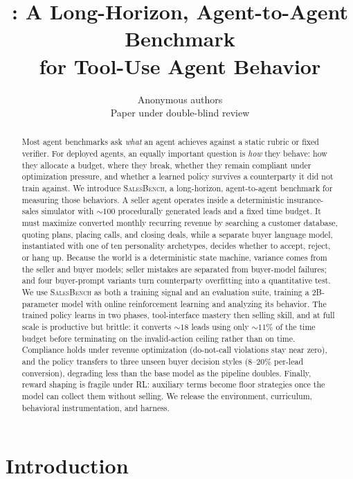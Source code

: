 \documentclass{article} %
\title{\salesbench{}: A Long-Horizon, Agent-to-Agent Benchmark\\ for Tool-Use Agent Behavior}
\author{Anonymous authors\\Paper under double-blind review}
\newcommand{\salesbench}{\textsc{SalesBench}}
\begin{document}
\ifcolmsubmission
\linenumbers
\fi

\maketitle

\begin{abstract}
Most agent benchmarks ask \emph{what} an agent achieves against a static rubric or fixed
verifier. For deployed agents, an equally important question is \emph{how} they behave:
how they allocate a budget, where they break, whether they remain compliant under
optimization pressure, and whether a learned policy survives a counterparty it did not
train against. We introduce \salesbench{}, a long-horizon, agent-to-agent benchmark for
measuring those behaviors. A seller agent operates inside a deterministic insurance-sales
simulator with ${\sim}100$ procedurally generated leads and a fixed time budget. It must
maximize converted monthly recurring revenue by searching a customer database, quoting plans, placing
calls, and closing deals, while a separate buyer language model, instantiated with one of
ten personality archetypes, decides whether to accept, reject, or hang up. Because the
world is a deterministic state machine, variance comes from the seller and buyer models;
seller mistakes are separated from buyer-model failures; and four buyer-prompt variants
turn counterparty overfitting into a quantitative test. We use \salesbench{} as both a
training signal and an evaluation suite, training a 2B-parameter model with online
reinforcement learning and analyzing its behavior. The trained policy learns in two phases, tool-interface mastery
then selling skill, and at full scale is productive but brittle: it converts ${\sim}18$ leads using only
${\sim}11\%$ of the time budget before terminating on the invalid-action ceiling rather than on time. Compliance holds
under revenue optimization (do-not-call violations stay near zero), and the policy transfers to three unseen buyer
decision styles ($8\text{--}20\%$ per-lead conversion), degrading less than the base model as the pipeline doubles.
Finally, reward shaping is fragile under RL: auxiliary terms become floor strategies once the model can collect them
without selling. We release the environment, curriculum, behavioral instrumentation, and harness.
\end{abstract}

\section{Introduction}
\end{document}
